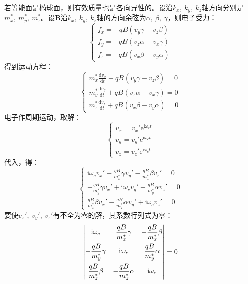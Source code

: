 若等能面是椭球面，则有效质量也是各向异性的。设沿$k_x,\ k_y,\ k_z$轴方向分别是$m_x^*,\ m_y^*,\ m_z^*$。设$\bm B$沿$k_x,\ k_y,\ k_z$轴的方向余弦为$\alpha,\ \beta,\ \gamma$，则电子受力：
\begin{equation}
\left\{
    \begin{aligned}
        f_x=-qB\left(v_y\gamma-v_z\beta\right)\\
        f_y=-qB\left(v_z\alpha-v_x\gamma\right)\\
        f_z=-qB\left(v_x\beta-v_y\alpha\right)
    \end{aligned}
\right.
\end{equation}
得到运动方程：
\begin{equation}
    \left\{
    \begin{aligned}
        m_x^*\frac{\mathrm{d}v_x}{\mathrm{d}t}+qB\left(v_y\gamma-v_z\beta\right)=0\\
        m_y^*\frac{\mathrm{d}v_y}{\mathrm{d}t}+qB\left(v_z\alpha-v_x\gamma\right)=0\\
        m_z^*\frac{\mathrm{d}v_z}{\mathrm{d}t}+qB\left(v_x\beta-v_y\alpha\right)=0
    \end{aligned}
    \right.
\end{equation}
电子作周期运动，取解：
\begin{equation}
    \left\{
    \begin{aligned}
        v_x=v_x'\mathrm{e}^{\mathrm{i}\omega_ct}\\
        v_y=v_y'\mathrm{e}^{\mathrm{i}\omega_ct}\\
        v_z=v_z'\mathrm{e}^{\mathrm{i}\omega_ct}
    \end{aligned}
    \right.
\end{equation}
代入，得：
\begin{equation}
    \left\{
    \begin{aligned}
        \mathrm{i}\omega_cv_x'+\frac{qB}{m_x^*}\gamma v_y'-\frac{qB}{m_x^*}\beta v_z'=0\\
        -\frac{qB}{m_y^*}\gamma v_x'+\mathrm{i}\omega_cv_y'+\frac{qB}{m_y^*}\alpha v_z'=0\\
        \frac{qB}{m_z^*}\beta v_x'-\frac{qB}{m_z^*}\alpha v_y'+\mathrm{i}\omega_cv_z'=0
    \end{aligned}
    \right.
\end{equation}
要使$v_x',\ v_y',\ v_z'$有不全为零的解，其系数行列式为零：
\begin{equation}
    \begin{vmatrix}
        \mathrm{i}\omega_c & \D\frac{qB}{m_x^*}\gamma & \D-\frac{qB}{m_x^*}\beta\vspace{1ex}\\
        \D-\frac{qB}{m_y^*}\gamma & \mathrm{i}\omega_c & \D\frac{qB}{m_y^*}\alpha\vspace{1ex}\\
        \D\frac{qB}{m_z^*}\beta & \D-\frac{qB}{m_z^*}\alpha & \mathrm{i}\omega_c
    \end{vmatrix}
    =0
\end{equation}
